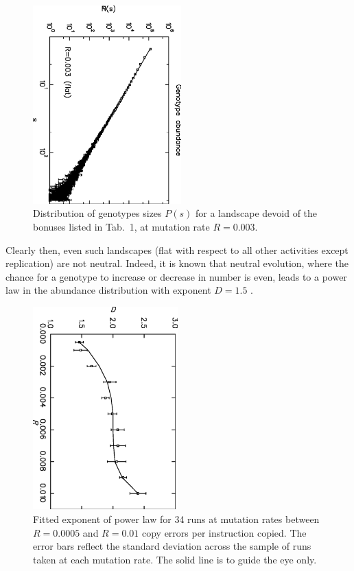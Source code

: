 \documentclass[letterpaper]{article}
\begin{document}
\begin{figure}[!tbp]
\begin{center}
\includegraphics[width=2.25in, angle=90]{fig4.eps}
\caption{Distribution of genotypes sizes $P(s)$ for a landscape devoid
  of the bonuses listed in Tab.~1, at mutation rate $R=0.003$.} \label{fig4}
\end{center}
\end{figure}


Clearly then, even such landscapes (flat with respect to all other
activities except replication) are not neutral. Indeed, it is known
that neutral evolution, where the chance for a genotype to increase or
decrease in number is even, leads to a power law in the abundance
distribution with exponent $D=1.5$ \citep{ABH}.


\begin{figure}[t]
\begin{center}
\includegraphics[width=2.2in, angle=90]{fig5.eps}
\vskip 0.25cm
\caption{Fitted exponent of power law for 34 runs at mutation rates
  between $R=0.0005$ and $R=0.01$ copy errors per instruction
  copied. The error bars reflect the standard deviation across the
  sample of runs taken at each mutation rate. The solid line is to
  guide the eye only.
}
\label{fig5}
\end{center}
\end{figure}
\end{document}

